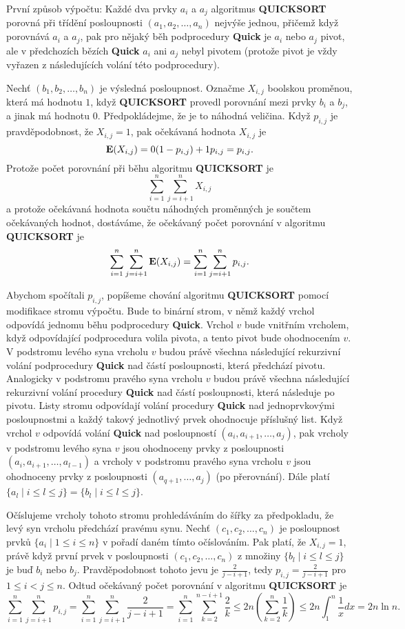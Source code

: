 \documentclass[a4paper,12pt]{article}
\begin{document}
První způsob výpočtu:\newline 
Každé dva prvky $a_i$ a $a_j$ algoritmus {\bf QUICKSORT} porovná 
při třídění posloupnosti $(a_1,a_2,\dots,a_n)$ nejvýše jednou, 
přičemž když porovnává $a_i$ a $a_j$, 
pak pro nějaký běh podprocedury {\bf Quick} je $a_i$ nebo $
a_j$ 
pivot, ale v předchozích bězích {\bf Quick} $a_i$ ani $
a_j$ 
nebyl pivotem (protože pivot je vždy vyřazen z následujících 
volání této podprocedury).

Nechť $(b_1,b_2,\dots,b_n)$ je výsledná posloupnost.  
Označme $X_{i,j}$ boolskou proměnou, která má hodnotu $
1$, 
když {\bf QUICKSORT} provedl porovnání mezi prvky $b_i$ a $
b_j$, a 
jinak má hodnotu $0$.  Předpokládejme, že je to náhodná 
veličina. Když $p_{i,j}$ je prav\-dě\-podobnost, že $
X_{i,j}=1$, 
pak očekávaná hodnota $X_{i,j}$ je 
$$\bold E(X_{i,j})=0(1-p_{i,j})+1p_{i,j}=p_{i,j}.$$
Protože počet porovnání  při běhu algoritmu {\bf QUICKSORT} je
$$\sum_{i=1}^n\sum_{j=i+1}^nX_{i,j}$$
a protože očekávaná hodnota součtu náhodných 
proměnných je součtem očekávaných hodnot, dostáváme, že 
očekávaný počet porovnání v algoritmu {\bf QUICKSORT} je
$$\sum_{i=1}^n\sum_{j=i+1}^n\bold E(X_{i,j})=\sum_{i=1}^n\sum_{j=
i+1}^np_{i,j}.$$

Abychom spočítali $p_{i,j}$, popíšeme chování algoritmu 
{\bf QUICKSORT} pomocí modifikace stromu výpočtu. Bude to binární 
strom, v němž každý vrchol odpovídá jednomu 
běhu podprocedury {\bf Quick}. Vrchol $v$ bude vnitřním 
vrcholem, 
když odpovída\-jí\-cí podprocedura volila pivota, a tento 
pivot bude ohodnocením $v$. V podstromu levého syna vrcholu $
v$
budou právě všechna následující rekurzivní volání podprocedury 
{\bf Quick} nad částí posloupnosti, která předchází pivotu. 
Analogicky v podstromu 
pravého syna vrcholu $v$ budou právě všechna následující 
rekurzivní volání procedury {\bf Quick} nad částí 
posloupnosti, která následuje po pivotu. 
Listy stromu odpovídají volání procedury {\bf Quick} nad 
jednoprvkovými posloupnost\-mi a každý takový jednotlivý 
prvek ohodnocuje příslušný  
list. Když vrchol $v$ odpovídá volání {\bf Quick} nad posloupností 
$(a_i,a_{i+1},\dots,a_j)$, pak vrcholy v podstromu levého syna $
v$ jsou 
ohodnoceny prvky z posloupnosti $(a_i,a_{i+1},\dots,a_{l-1})$ a vrcholy v 
podstromu pravého syna vrcholu $v$ jsou ohodnoceny prvky z posloupnosti 
$(a_{q+1},\dots,a_j)$ (po přerovnání).
Dále platí $\{a_l\mid i\le l\le j\}=\{b_l\mid i\le l\le j\}$.

Očíslujeme vrcholy tohoto stromu prohledáváním do 
šířky za předpokladu, že levý syn vrcholu předchází 
pravému synu. Nechť $(c_1,c_2,\dots,c_n)$ je posloupnost 
prvků $\{a_i\mid 1\le i\le n\}$ v pořadí daném tímto 
očíslováním. Pak platí, že $X_{i,j}=1$, právě když první 
prvek v posloupnosti $(c_1,c_2,\dots,c_n)$ z množi\-ny 
$\{b_l\mid i\le l\le j\}$ je buď $b_i$ nebo $b_j$. Pravděpodobnost tohoto 
jevu je $\frac 2{j-i+1}$, tedy $p_{i,j}=\frac 2{j-i+1}$ pro $1\le 
i<j\le n$. Odtud 
očekávaný počet porovnání v algoritmu {\bf QUICKSORT} je
$$\sum_{i=1}^n\sum_{j=i+1}^np_{i,j}=\sum_{i=1}^n\sum_{j=i+1}^n\frac 
2{j-i+1}=\sum_{i=1}^n\sum_{k=2}^{n-i+1}\frac 2k\le 2n(\sum_{k=2}^
n\frac 1k)\le 2n\int_1^n\frac 1xdx=2n\ln n.$$
\end{document}

